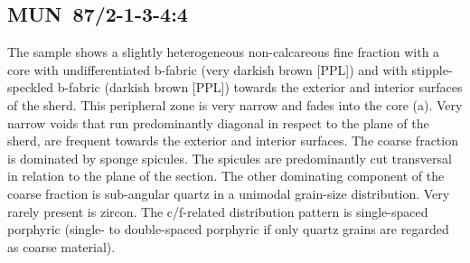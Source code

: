 \documentclass[a4paper]{article}
\begin{document}
\newpage\subsection{MUN~87/2-1-3-4:4 \citep[mun\#100; Fig.~\ref{fig:mun.pottery}.8; Pikunda-Munda style;][473 Pl.~92.4]{Seidensticker.2021e}}

\begin{multicols}{2}
\noindent The sample shows a slightly heterogeneous non-calcareous fine fraction with a core with undifferentiated b-fabric (very darkish brown [PPL]) and with stipple-speckled b-fabric (darkish brown [PPL]) towards the exterior and interior surfaces of the sherd. This peripheral zone is very narrow and fades into the core (a). Very narrow voids that run predominantly diagonal in respect to the plane of the sherd, are frequent towards the exterior and interior surfaces. The coarse fraction is dominated by sponge spicules. The spicules are predominantly cut transversal in relation to the plane of the section. The other dominating component of the coarse fraction is sub-angular quartz in a unimodal grain-size distribution. Very rarely present is zircon. The c/f-related distribution pattern is single-spaced porphyric (single- to double-spaced porphyric if only quartz grains are regarded as coarse material).
\end{multicols}
\end{document}
